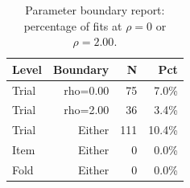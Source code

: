 \begin{table}[htbp]
\centering
\caption{Parameter boundary report: percentage of fits at $\rho = 0$ or $\rho = 2.00$.}
\label{tab:boundary-report}
\begin{tabular}{lrrr}
\toprule
Level & Boundary & N & Pct \\
\midrule
Trial & rho=0.00 & 75 & 7.0\% \\
Trial & rho=2.00 & 36 & 3.4\% \\
Trial & Either & 111 & 10.4\% \\
Item & Either & 0 & 0.0\% \\
Fold & Either & 0 & 0.0\% \\
\bottomrule
\end{tabular}
\end{table}